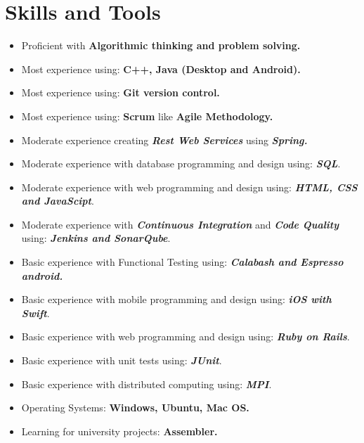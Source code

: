 \documentclass[a4paper,10pt]{article} %
\begin{document}

\section{Skills and Tools}
\begin{itemize}
 \item Proficient with \textbf{Algorithmic thinking and problem solving.}
 \item Most experience using: \textbf{C++, Java (Desktop and Android).}
 \item Most experience using: \textbf{Git version control.}
 \item Most experience using: \textbf{Scrum} like \textbf{Agile Methodology.}
  \item Moderate experience creating {\sl \textbf{Rest Web Services}} using {\sl \textbf{Spring.}}
 \item Moderate experience with database programming and design using: {\sl \textbf{SQL}}.
 \item Moderate experience with web programming and design using: {\sl \textbf{HTML, CSS and JavaScipt}}.
 \item Moderate experience with {\sl \textbf{Continuous Integration}} and {\sl \textbf{Code Quality}} using: {\sl \textbf{Jenkins and SonarQube}}.
 \item Basic experience with Functional Testing using: {\sl \textbf{Calabash and Espresso android.}}
 \item Basic experience with mobile programming and design using: {\sl \textbf{iOS with Swift}}.
 \item Basic experience with web programming and design using: {\sl \textbf{Ruby on Rails}}.
 \item Basic experience with unit tests using: {\sl \textbf{JUnit}}.
 \item Basic experience with distributed computing using: {\sl \textbf{MPI}}.
 \item Operating Systems: \textbf{Windows, Ubuntu, Mac OS.}
 \item Learning for university projects: \textbf{Assembler.}
\end{itemize}

\end{document}
